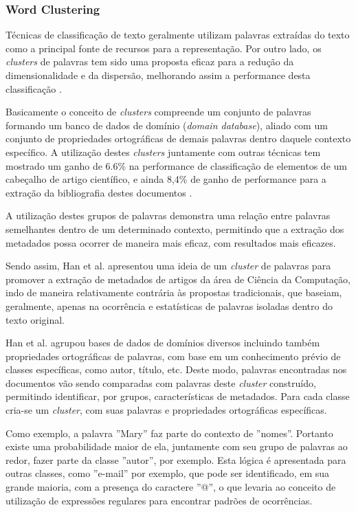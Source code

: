 \subsubsection{Word Clustering}
\label{sssec:word-clustering}

\begin{textnew}

Técnicas de classificação de texto geralmente utilizam palavras extraídas do texto como a principal fonte de recursos para a representação. Por outro lado, os \textit{clusters} de palavras tem sido uma proposta eficaz para a redução da dimensionalidade e da dispersão, melhorando assim a performance desta classificação \cite{Han-Giles-WC}.

Basicamente o conceito de \textit{clusters} compreende um conjunto de palavras formando um banco de dados de domínio (\textit{domain database}), aliado com um conjunto de propriedades ortográficas de demais palavras dentro daquele contexto específico. A utilização destes \textit{clusters} juntamente com outras técnicas tem mostrado um ganho de 6.6\% na performance de classificação de elementos de um cabeçalho de artigo científico, e ainda 8,4\% de ganho de performance para a extração da bibliografia destes documentos \cite{Han-Giles-WC}.

A utilização destes grupos de palavras demonstra uma relação entre palavras semelhantes dentro de um determinado contexto, permitindo que a extração dos metadados possa ocorrer de maneira mais eficaz, com resultados mais eficazes.

\end{textnew}


\begin{textedited}

Sendo assim, Han et al. apresentou uma ideia de um \textit{cluster} de palavras para promover a extração de metadados de artigos da área de Ciência da Computação, indo de maneira relativamente contrária às propostas tradicionais, que baseiam, geralmente, apenas na ocorrência e estatísticas de palavras isoladas dentro do texto original.

Han et al. agrupou bases de dados de domínios diversos incluindo também propriedades ortográficas de palavras, com base em um conhecimento prévio de classes específicas, como autor, título, etc. Deste modo, palavras encontradas nos documentos vão sendo comparadas com palavras deste \textit{cluster} construído, permitindo identificar, por grupos, características de metadados. Para cada classe cria-se um \textit{cluster}, com suas palavras e propriedades ortográficas específicas.

Como exemplo, a palavra ''Mary'' faz parte do contexto de ''nomes''. Portanto existe uma probabilidade maior de ela, juntamente com seu grupo de palavras ao redor, fazer parte da classe ''autor'', por exemplo. Esta lógica é apresentada para outras classes, como ''e-mail'' por exemplo, que pode ser identificado, em sua grande maioria, com a presença do caractere ''@'', o que levaria ao conceito de utilização de expressões regulares para encontrar padrões de ocorrências.

\end{textedited}

